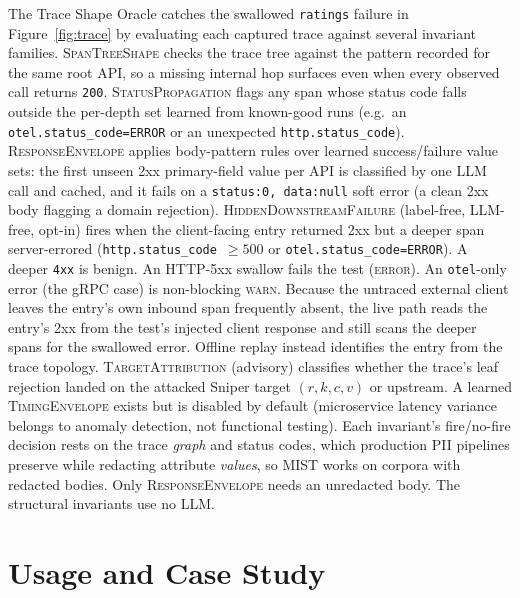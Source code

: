 \documentclass[sigconf,screen,review]{acmart}
\begin{document}
The Trace Shape Oracle catches the swallowed \texttt{ratings} failure in Figure~\ref{fig:trace} by evaluating each captured trace against several invariant families. \textsc{SpanTreeShape} checks the trace tree against the pattern recorded for the same root API, so a missing internal hop surfaces even when every observed call returns \texttt{200}. \textsc{StatusPropagation} flags any span whose status code falls outside the per-depth set learned from known-good runs (e.g.\ an \texttt{otel.\allowbreak status\_code=ERROR} or an unexpected \texttt{http.\allowbreak status\_code}). \textsc{ResponseEnvelope} applies body-pattern rules over learned success/failure value sets: the first unseen 2xx primary-field value per API is classified by one LLM call and cached, and it fails on a \texttt{status:0, data:null} soft error (a clean 2xx body flagging a domain rejection). \textsc{HiddenDownstreamFailure} (label-free, LLM-free, opt-in) fires when the client-facing entry returned 2xx but a deeper span server-errored (\texttt{http.\allowbreak status\_code}~$\geq 500$ or \texttt{otel.\allowbreak status\_code=ERROR}). A deeper \texttt{4xx} is benign. An HTTP-5xx swallow fails the test (\textsc{error}). An \texttt{otel}-only error (the gRPC case) is non-blocking \textsc{warn}. Because the untraced external client leaves the entry's own inbound span frequently absent, the live path reads the entry's 2xx from the test's injected client response and still scans the deeper spans for the swallowed error. Offline replay instead identifies the entry from the trace topology.
\textsc{TargetAttribution} (advisory) classifies whether the trace's leaf rejection landed on the attacked Sniper target $(r,k,c,v)$ or upstream. A learned \textsc{TimingEnvelope} exists but is disabled by default (microservice latency variance belongs to anomaly detection, not functional testing). Each invariant's fire/no-fire decision rests on the trace \emph{graph} and status codes, which production PII pipelines preserve while redacting attribute \emph{values}, so MIST works on corpora with redacted bodies. Only \textsc{ResponseEnvelope} needs an unredacted body. The structural invariants use no LLM.

\section{Usage and Case Study}\label{sec:case}
\end{document}
